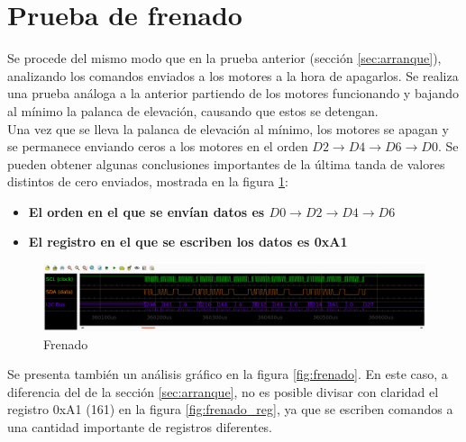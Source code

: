\documentclass[main]{subfiles}
\begin{document}
\section{Prueba de frenado}
\label{sec:frenado}
Se procede del mismo modo que en la prueba anterior (secci\'on \ref{sec:arranque}), analizando los comandos enviados a los motores a la hora de apagarlos. Se realiza una prueba an\'aloga a la anterior partiendo de los motores funcionando y bajando al m\'inimo la palanca de elevaci\'on, causando que estos se detengan.\\

Una vez que se lleva la palanca de elevaci\'on al m\'inimo, los motores se apagan y se permanece enviando ceros a los motores en el orden $D2\rightarrow D4\rightarrow D6\rightarrow D0$. Se pueden obtener algunas conclusiones importantes de la \'ultima tanda de valores distintos de cero enviados, mostrada en la figura \ref{fig:snif_frenado}:
\begin{itemize}
\item \textbf{El orden en el que se env\'ian datos es $D0\rightarrow D2\rightarrow D4\rightarrow D6$}
\item \textbf{El registro en el que se escriben los datos es 0xA1}
\end{itemize}

\begin{figure}[h!]
	\centering
	\includegraphics[width=1\textwidth]{./pics_sniffer/snif_frenado.png}
	\caption{Frenado}
	\label{fig:snif_frenado}
\end{figure}

Se presenta tambi\'en un an\'alisis gr\'afico en la figura \ref{fig:frenado}. En este caso, a diferencia del de la secci\'on \ref{sec:arranque}, no es posible divisar con claridad el registro 0xA1 (161) en la figura \ref{fig:frenado_reg}, ya que se escriben comandos a una cantidad importante de registros diferentes.\\
\end{document}
